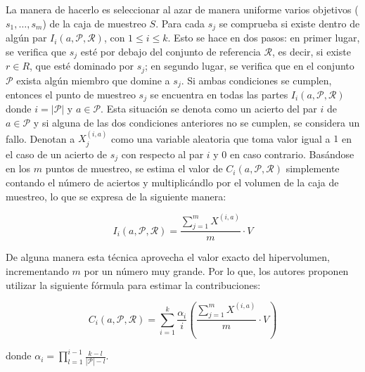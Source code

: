   La manera de hacerlo es seleccionar al azar de manera uniforme varios objetivos ($s_1, \ldots, s_m$) de la caja de muestreo $S$. 
  Para cada $s_j$ se comprueba si existe dentro de alg\'un par $I_i\left(a,\mathcal{P},\mathcal{R} \right)$, con
  $1 \leq i \leq k$. Esto se hace en dos pasos: en primer lugar, se verifica que $s_j$ est\'e por debajo del conjunto de 
  referencia $\mathcal{R}$, es decir, si existe $r \in R$, que est\'e dominado por $s_j$; en segundo lugar, se 
  verifica que en el conjunto $\mathcal{P}$ exista alg\'un miembro que domine a $s_j$. Si ambas condiciones se cumplen, 
  entonces el punto de muestreo $s_j$ se encuentra en todas las partes $I_i\left(a,\mathcal{P},\mathcal{R} \right)$
  donde $i=|\mathcal{P}|$ y $a \in \mathcal{P}$. Esta situaci\'on se denota como un acierto del par $i$ de $a \in \mathcal{P}$ y si 
  alguna de las dos condiciones anteriores no se cumplen, se considera un fallo. Denotan a $X^{\left(i, a\right)}_{j}$ como una variable 
  aleatoria que toma valor igual a $1$ en el caso de un acierto de  $s_j$ con respecto al par $i$ y $0$ en caso contrario. Bas\'andose 
  en los $m$ puntos de muestreo, se estima el valor de $C_i\left(a, \mathcal{P},\mathcal{R} \right)$ simplemente contando el 
  n\'umero de aciertos y multiplic\'andlo por el volumen de la caja de muestreo, lo que se expresa de la siguiente manera:
  
    \[I_i\left(a, \mathcal{P},\mathcal{R} \right) = \frac{\sum^{m}_{j=1}{X^{\left(i, a\right)}}}{m} \cdot V\]
    
  De alguna manera esta t\'ecnica aprovecha el valor exacto del hipervolumen, incrementando $m$ por un n\'umero muy grande. Por lo 
  que, los autores proponen utilizar la siguiente f\'ormula para estimar la contribuciones:
    
  \[C_i\left(a, \mathcal{P},\mathcal{R} \right) = \sum^{k}_{i=1}{\frac{\alpha_i}{i}}\left(\frac{\sum^{m}_{j=1}{X^{\left(i, a\right)}}}{m} \cdot V\right)\]
  
  {\setlength{\parindent}{0pt}
  donde $\alpha_i = \prod^{i-1}_{l=1} \frac{k-l}{\left|\mathcal{P}\right|-l}$.
  }
    
